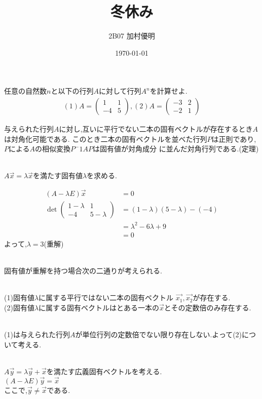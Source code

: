 \documentclass{jsarticle}
\title{冬休み}
\date{\today}
\author{2B07 加村優明}
\begin{document}
\maketitle

任意の自然数$n$と以下の行列$A$に対して行列$A^n$を計算せよ.
  \begin{align*}
  (1)A = \begin{pmatrix}
     1 & 1 \\
    -4 & 5
         \end{pmatrix},
  (2)A = \begin{pmatrix}
    -3 & 2 \\
    -2 & 1
         \end{pmatrix}         
  \end{align*}

与えられた行列$A$に対し,互いに平行でない二本の固有ベクトルが存在するとき$A$は対角化可能である.
このとき二本の固有ベクトルを並べた行列$P$は正則であり,$P$による$A$の相似変換$P^-1 AP$は固有値が対角成分
に並んだ対角行列である.(定理)

\leavevmode\\
$A \overrightarrow{x} = \lambda \overrightarrow{x}$を満たす固有値$\lambda$を求める. 

  \begin{align*}
    (A-\lambda E)\overrightarrow{x} &= 0\\
    \det\begin{pmatrix}
    1-\lambda & 1 \\
    -4 & 5-\lambda 
    \end{pmatrix}
  &=(1-\lambda)(5-\lambda)-(-4)\\
  &=\lambda ^2 -6\lambda +9\\
  &=0
  \end{align*} 
よって,$\lambda = 3$(重解)

\leavevmode\\
固有値が重解を持つ場合次の二通りが考えられる.

\leavevmode\\
(1)固有値$\lambda$に属する平行ではない二本の固有ベクトル $\overrightarrow{x_1},\overrightarrow{x_2}$が存在する.
\leavevmode\\
(2)固有値$\lambda$に属する固有ベクトルはとある一本の$\overrightarrow{x}$とその定数倍のみ存在する.

\leavevmode\\
(1)は与えられた行列$A$が単位行列の定数倍でない限り存在しない.よって(2)について考える.

\leavevmode\\
$A \overrightarrow{y} = \lambda \overrightarrow{y} + \overrightarrow{x}$を満たす広義固有ベクトルを考える.\\
$(A -\lambda E)\overrightarrow{y} = \overrightarrow{x}$\\ここで,$\overrightarrow{y}\neq \overrightarrow{x}である.$   
 
\end{document}
